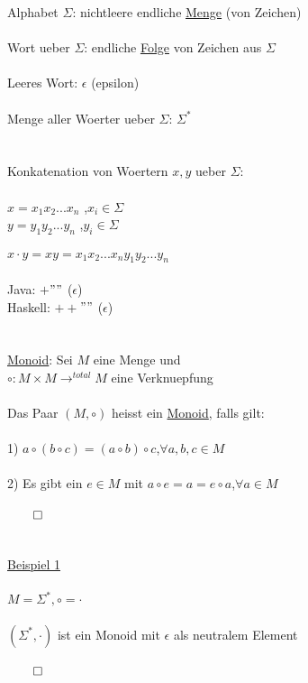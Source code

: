 \documentclass[18pt,a4paper]{scrreprt}
\newcommand{\tab}{\hspace*{2em}}
\begin{document}
Alphabet $\Sigma$: nichtleere endliche \uline{Menge} (von Zeichen)\\
\\
Wort ueber $\Sigma$: endliche \uline{Folge} von Zeichen aus $\Sigma$\\
\\
Leeres Wort: $\epsilon$ (epsilon)\\
\\
Menge aller Woerter ueber $\Sigma$: $\Sigma^*$\\
\\
\\
Konkatenation von Woertern $x,y$ ueber $\Sigma$:\\
\\
$x = x_1x_2 ... x_n$ \tab ,$x_i \in \Sigma$\\
$y = y_1y_2 ... y_n$\tab\:\: ,$y_i \in \Sigma$\\
\\
$x \cdot y = xy = x_1x_2 ... x_ny_1y_2 ... y_n$\\
\\
Java: $+$\tab\tab $""$ ($\epsilon$)\\
Haskell: $++$\tab $""$ ($\epsilon$)\\
\\
\\
\uline{Monoid}: Sei $M$ eine Menge und\\
\tab $\circ : M \times M \rightarrow^{total} M$ eine Verknuepfung\\
\\
Das Paar $(M, \circ)$ heisst ein \uline{Monoid}, falls gilt:\\
\\
1) $a \circ (b \circ c) = (a \circ b) \circ c$\tab ,$\forall a,b,c \in M$\\
\\
2) Es gibt ein $e \in M$ mit $a \circ e = a = e \circ a$\tab ,$\forall a \in M$\\
\\
$\qed$\\
\\
\\
\uline{Beispiel 1}\\
\\
$M = \Sigma^*, \circ = \cdot$\\
\\
$(\Sigma^*, \cdot)$ ist ein Monoid mit $\epsilon$ als neutralem Element\\
\\
$\qed$\\
\\
\end{document}
